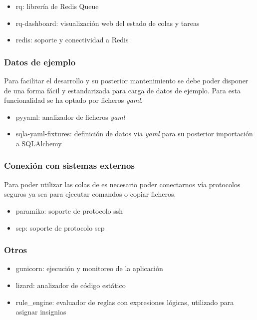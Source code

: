 \documentclass[11pt,spanish,listoffigures,listoftables]{tfgetsinf}
\begin{document}
\begin{itemize}
	\item rq: librería de Redis Queue
	\item rq-dashboard: visualización web del estado de \Gls{cola}s y \Gls{tarea}s
	\item redis: soporte y conectividad a Redis 
\end{itemize}

\subsubsection{Datos de ejemplo}

Para facilitar el desarrollo y su posterior mantenimiento se debe poder disponer de una forma fácil y estandarizada para carga de datos de ejemplo. Para esta funcionalidad se ha optado por ficheros \textit{yaml}.

\begin{itemize}
	\item pyyaml: analizador de ficheros \textit{yaml} 
	\item sqla-yaml-fixtures: definición de datos via \textit{yaml} para su posterior importación a SQLAlchemy
\end{itemize}

\subsubsection{Conexión con sistemas externos}

Para poder utilizar las \Gls{cola}s de \kahan es necesario poder conectarnos vía protocolos seguros ya sea para ejecutar comandos o copiar ficheros.

\begin{itemize}
	\item paramiko: soporte de protocolo \acrshort{ssh}
	\item scp: soporte de protocolo \acrshort{scp}
\end{itemize}

\subsubsection{Otros}

\begin{itemize}
	\item gunicorn: ejecución y monitoreo de la aplicación
	\item lizard: analizador de código estático
	\item rule\_engine: evaluador de reglas con expresiones lógicas, utilizado para asignar \Gls{insignia}s
\end{itemize}
\end{document}
